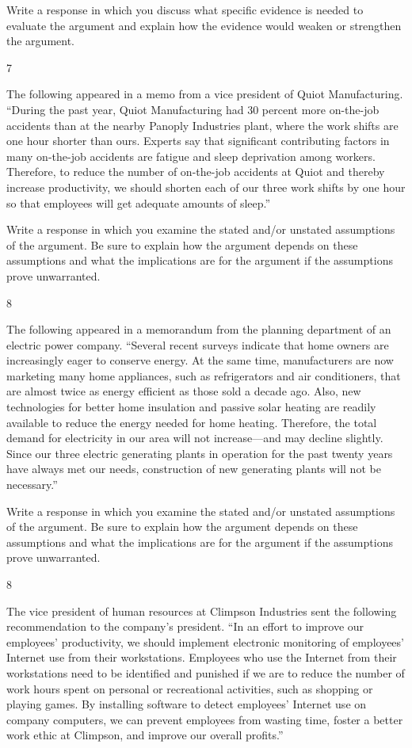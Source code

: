\documentclass[]{article}
\begin{document}
Write a response in which you discuss what specific evidence is needed
to evaluate the argument and explain how the evidence would weaken or
strengthen the argument.

7

The following appeared in a memo from a vice president of Quiot
Manufacturing. ``During the past year, Quiot Manufacturing had 30
percent more on-the-job accidents than at the nearby Panoply Industries
plant, where the work shifts are one hour shorter than ours. Experts say
that significant contributing factors in many on-the-job accidents are
fatigue and sleep deprivation among workers. Therefore, to reduce the
number of on-the-job accidents at Quiot and thereby increase
productivity, we should shorten each of our three work shifts by one
hour so that employees will get adequate amounts of sleep.''

Write a response in which you examine the stated and/or unstated
assumptions of the argument. Be sure to explain how the argument depends
on these assumptions and what the implications are for the argument if
the assumptions prove unwarranted.

8

The following appeared in a memorandum from the planning department of
an electric power company. ``Several recent surveys indicate that home
owners are increasingly eager to conserve energy. At the same time,
manufacturers are now marketing many home appliances, such as
refrigerators and air conditioners, that are almost twice as energy
efficient as those sold a decade ago. Also, new technologies for better
home insulation and passive solar heating are readily available to
reduce the energy needed for home heating. Therefore, the total demand
for electricity in our area will not increase---and may decline
slightly. Since our three electric generating plants in operation for
the past twenty years have always met our needs, construction of new
generating plants will not be necessary.''

Write a response in which you examine the stated and/or unstated
assumptions of the argument. Be sure to explain how the argument depends
on these assumptions and what the implications are for the argument if
the assumptions prove unwarranted.

8

The vice president of human resources at Climpson Industries sent the
following recommendation to the company's president. ``In an effort to
improve our employees' productivity, we should implement electronic
monitoring of employees' Internet use from their workstations. Employees
who use the Internet from their workstations need to be identified and
punished if we are to reduce the number of work hours spent on personal
or recreational activities, such as shopping or playing games. By
installing software to detect employees' Internet use on company
computers, we can prevent employees from wasting time, foster a better
work ethic at Climpson, and improve our overall profits.''
\end{document}
